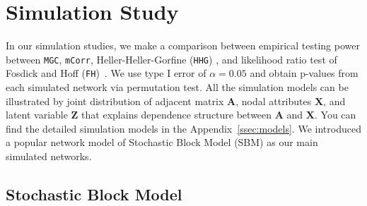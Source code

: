 \documentclass[11pt]{article}
\theoremstyle{definition}
\begin{document}
\section{Simulation Study}
\label{sec:simulation}
	\vspace*{-0.2cm}
In our simulation studies, we make a comparison between empirical testing power between \texttt{MGC}, \texttt{mCorr}, Heller-Heller-Gorfine (\texttt{HHG}) \citep{heller2012consistent}, and likelihood ratio test of Fosdick and Hoff (\texttt{FH})~\citep{fosdick2015testing}. We use type I error of $\alpha = 0.05$ and obtain p-values from each simulated network via permutation test. All the simulation models can be illustrated by joint distribution of adjacent matrix $\mathbf{A}$, nodal attributes $\mathbf{X}$, and latent variable $\mathbf{Z}$ that explains dependence structure between $\mathbf{A}$ and $\mathbf{X}$. You can find the detailed simulation models in the Appendix~\ref{ssec:models}. We introduced a popular network model of Stochastic Block Model (SBM) as our main simulated networks. 

\subsection{Stochastic Block Model}
\end{document}
